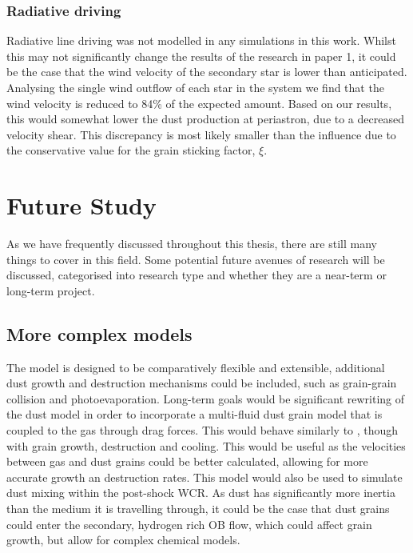 \subsubsection{Radiative driving}

Radiative line driving was not modelled in any simulations in this work.
Whilst this may not significantly change the results of the research in paper 1, it could be the case that the wind velocity of the secondary star is lower than anticipated.
Analysing the single wind outflow of each star in the system we find that the wind velocity is reduced to 84\% of the expected amount.
Based on our results, this would somewhat lower the dust production at periastron, due to a decreased velocity shear.
This discrepancy is most likely smaller than the influence due to the conservative value for the grain sticking factor, $\xi$.

\section{Future Study}

As we have frequently discussed throughout this thesis, there are still many things to cover in this field.
Some potential future avenues of research will be discussed, categorised into research type and whether they are a near-term or long-term project.

\subsection{More complex models}

The \bidmas{} model is designed to be comparatively flexible and extensible, additional dust growth and destruction mechanisms could be included, such as grain-grain collision and photoevaporation.
Long-term goals would be significant rewriting of the dust model in order to incorporate a multi-fluid dust grain model that is coupled to the gas through drag forces.
This would behave similarly to \textcite{hendrix_pinwheels_2016}, though with grain growth, destruction and cooling.
This would be useful as the velocities between gas and dust grains could be better calculated, allowing for more accurate growth an destruction rates.
This model would also be used to simulate dust mixing within the post-shock WCR.
As dust has significantly more inertia than the medium it is travelling through, it could be the case that dust grains could enter the secondary, hydrogen rich OB flow, which could affect grain growth, but allow for complex chemical models. 

